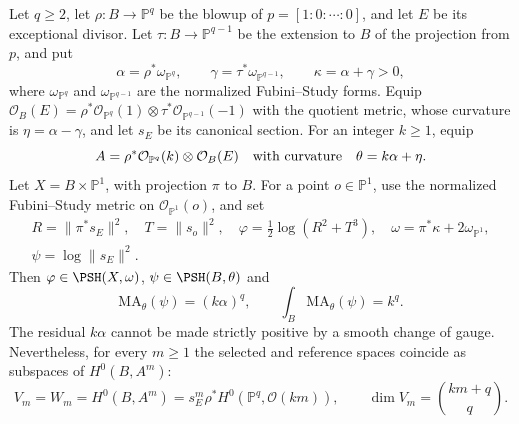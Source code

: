 \begin{example}\label{ex:exceptional-semipositive-fiber-series}
Let $q\geq2$, let $\rho\colon B\to\mathbb P^q$ be the blowup of $p=[1:0:\cdots:0]$, and let $E$ be its exceptional divisor. Let $\tau\colon B\to\mathbb P^{q-1}$ be the extension to $B$ of the projection from $p$, and put
\[
 \alpha=\rho^*\omega_{\mathbb P^q},\qquad
 \gamma=\tau^*\omega_{\mathbb P^{q-1}},\qquad
 \kappa=\alpha+\gamma>0,
\]
where $\omega_{\mathbb P^q}$ and $\omega_{\mathbb P^{q-1}}$ are the normalized Fubini--Study forms. Equip $\mathcal O_B(E)=\rho^*\mathcal O_{\mathbb P^q}(1)\otimes\tau^*\mathcal O_{\mathbb P^{q-1}}(-1)$ with the quotient metric, whose curvature is $\eta=\alpha-\gamma$, and let $s_E$ be its canonical section. For an integer $k\geq1$, equip
\[
 A=\rho^*\mathcal O_{\mathbb P^q}(k)\otimes\mathcal O_B(E)
 \quad\hbox{with curvature}\quad \theta=k\alpha+\eta.
\]
Let $X=B\times\mathbb P^1$, with projection $\pi$ to $B$. For a point $o\in\mathbb P^1$, use the normalized Fubini--Study metric on $\mathcal O_{\mathbb P^1}(o)$, and set
\[
 \begin{gathered}
 R=\|\pi^*s_E\|^2,\quad T=\|s_o\|^2,\quad
 \varphi=\tfrac12\log(R^2+T^3),\quad
 \omega=\pi^*\kappa+2\omega_{\mathbb P^1},\\
 \psi=\log\|s_E\|^2.
 \end{gathered}
\]
Then $\varphi\in\PSH(X,\omega)$, $\psi\in\PSH(B,\theta)$ and
\[
 \mathrm{MA}_\theta(\psi)=(k\alpha)^q,\qquad
 \int_B\mathrm{MA}_\theta(\psi)=k^q.
\]
The residual $k\alpha$ cannot be made strictly positive by a smooth change of gauge. Nevertheless, for every $m\geq1$ the selected and reference spaces coincide as subspaces of $H^0(B,A^m)$:
\[
 V_m=W_m=H^0(B,A^m)
      =s_E^m\rho^*H^0(\mathbb P^q,\mathcal O(km)),
 \qquad \dim V_m=\binom{km+q}{q}.
\]
\end{example}
